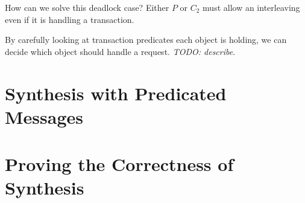 \documentclass[format=manuscript]{acmart}
\begin{document}
How can we solve this deadlock case? Either $P$ or $C_2$ must allow an
interleaving even if it is handling a transaction.

By carefully looking at transaction predicates each object is holding, we can
decide which object should handle a request. \emph{TODO: describe}.

\section{Synthesis with Predicated Messages}

\section{Proving the Correctness of Synthesis}
\end{document}
